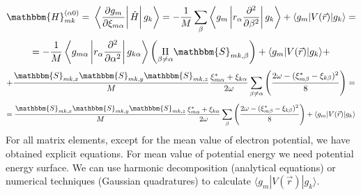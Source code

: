 $$\mathbbm{H}_{mk}^{(\alpha0)}=\left.\left.\left\langle\frac{\partial g_m}{\partial\xi_{m\alpha}}\right|\hat{H}\right|g_k\right\rangle=%
  -\frac{1}{M}\sum_{\beta}\left\langle g_m\left|r_{\alpha}\frac{\partial^2}{\partial\beta^2}\right|g_k\right\rangle+\langle g_m|V(\vec{r})|g_k\rangle=$$
$$=-\frac{1}{M}\left\langle g_{m\alpha}\left|r_{\alpha}\frac{\partial^2}{\partial\alpha^2}\right|g_{k\alpha}\right\rangle\left(\underset{\beta\neq\alpha}{\Pi}\mathbbm{S}_{mk,\beta}\right)+%
   \langle g_m|V(\vec{r})|g_k\rangle+$$
$$ +\frac{\mathbbm{S}_{mk,x}\mathbbm{S}_{mk,y}\mathbbm{S}_{mk,z}}{M}\frac{\xi_{m\alpha}^*+\xi_{k\alpha}}{2\omega}%
    \sum_{\beta\neq\alpha}\left(\frac{2\omega-(\xi_{m\beta}^*-\xi_{k\beta})^2}{8}\right)=$$
$$=\frac{\mathbbm{S}_{mk,x}\mathbbm{S}_{mk,y}\mathbbm{S}_{mk,z}}{M}\frac{\xi_{m\alpha}^*+\xi_{k\alpha}}{2\omega}%
    \sum_{\beta}\left(\frac{2\omega-(\xi_{m\beta}^*-\xi_{k\beta})^2}{8}\right)+\langle g_m|V(\vec{r})|g_k\rangle$$
For all matrix elements, except for the mean value of electron potential, we have obtained explicit equations.
For mean value of potential energy we need potential energy surface.
We can use harmonic decomposition (analytical equations) 
or numerical techniques (Gaussian quadratures) to calculate $\langle g_m|V(\vec{r})|g_k\rangle$.

